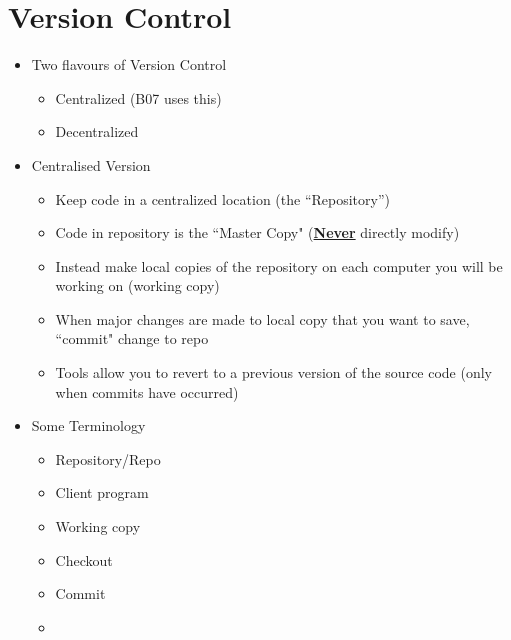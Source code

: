 
\usepackage{multicol}


	\section{Version Control}

	\begin{itemize}
		\item Two flavours of Version Control
		\begin{itemize}
			\item Centralized (B07 uses this)
			\item Decentralized
		\end{itemize}

		\item Centralised Version
		\begin{itemize}
			\item Keep code in a centralized location (the “Repository”)
			\item Code in repository is the ``Master Copy" (\textbf{\underline{Never}} directly modify)
			\item Instead make local copies of the repository on each computer you will be working on (working copy)
			\item When major changes are made to local copy that you want to save, ``commit" change to repo
			\item Tools allow you to revert to a previous version of the source code (only when commits have occurred)
		\end{itemize}

		\item Some Terminology
		\begin{multicols}{4}
			\begin{itemize}
				\item Repository/Repo
				\item Client program
				\item Working copy
				\item Checkout
				\item Commit
				\item[\phantom{Spacekeeper}]
			\end{itemize}
		\end{multicols}



\end{itemize}
